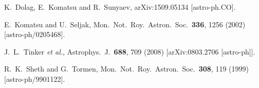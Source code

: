 \documentclass[aps,twocolumn,floats,prd,nofootinbib,10pt,floatfix]{revtex4-1}
\begin{document}
\begin{thebibliography}{99}
  K.~Dolag, E.~Komatsu and R.~Sunyaev,
  arXiv:1509.05134 [astro-ph.CO].

  E.~Komatsu and U.~Seljak,
  Mon.\ Not.\ Roy.\ Astron.\ Soc.\  {\bf 336}, 1256 (2002)
  [astro-ph/0205468].


  J.~L.~Tinker {\it et al.},
  Astrophys.\ J.\  {\bf 688}, 709 (2008)
  [arXiv:0803.2706 [astro-ph]].

  R.~K.~Sheth and G.~Tormen,
  Mon.\ Not.\ Roy.\ Astron.\ Soc.\  {\bf 308}, 119 (1999)
  [astro-ph/9901122].


\end{thebibliography}
\end{document}
